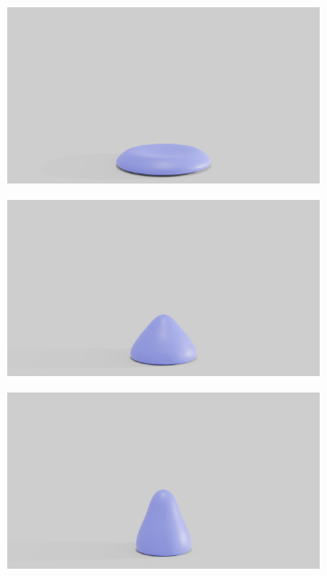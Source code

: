 \begin{figure}[htp!]
\begin{subfigure}{.16\linewidth}
		\label{sfig:ball-vc-3}
	\end{subfigure}%
	\begin{subfigure}{.16\linewidth}
		\centering
		{\includegraphics[width=2.0\textwidth]{images/soft_ball/vp/0350.jpg}}
		\label{sfig:ball-vc-4}
	\end{subfigure}%
	\begin{subfigure}{.16\linewidth}
		\centering
		{\includegraphics[width=2.0\textwidth]{images/soft_ball/vp/0400.jpg}}
		\label{sfig:ball-vc-5}
	\end{subfigure}%
	\begin{subfigure}{.16\linewidth}
		\centering
		{\includegraphics[width=2.0\textwidth]{images/soft_ball/vp/0450.jpg}}

\end{subfigure}
\end{figure}

